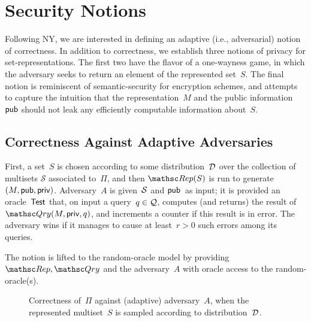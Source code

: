 \section{Security Notions}
\label{sec:security-notions}
Following NY, we are interested in defining an adaptive (i.e.,
adversarial) notion of correctness.
In addition to correctness, we establish three notions of privacy for
set-representations. The first two have the flavor of a one-wayness
game, in which the adversary seeks to return an element of the
represented set~$S$.  The final notion is reminiscent of
semantic-security for encryption schemes, and attempts to capture the
intuition that the representation~$M$ and the public
information~${\sf pub}$ should not leak any efficiently computable
information about~$S$.


\subsection{Correctness Against Adaptive Adversaries}

First, a set~$S$ is chosen according to some
distribution~$\mathcal{D}_{}^{}$ over the collection of multisets
$\mathcal{S}$ associated to~$\Pi$, and then
$\Rep(S)$ is run to generate $(M,{\sf pub},{\sf priv})$.
Adversary~$A$ is given~${\cal S}$ and ${\sf pub}$~as input; it is
provided an oracle~$\mathsf{Test}$ that, on input a query~$q \in {\cal Q}$,
computes (and returns) the result of $\Qry(M,\privaux,q)$, and increments
a counter if this result is in error.  The adversary wins if it
manages to cause at least~$r>0$ such errors among its queries.

The notion is lifted to the random-oracle model by providing
$\Rep,\Qry$ and the adversary~$A$ with oracle access to the
random-oracle(s).



\begin{figure}[htp]
\centering
{}
\caption{Correctness of~$\Pi$ against (adaptive) adversary~$A$, when
  the represented multiset~$S$ is sampled according to distribution~$\mathcal{D}_{}^{}$.}
\label{fig:correctness}
\end{figure}

